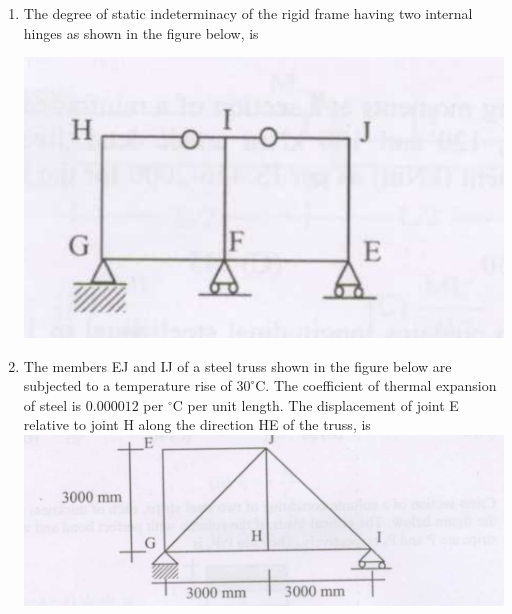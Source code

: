 \documentclass[journal]{IEEEtran}
\begin{document}
\begin{enumerate}
\begin{enumerate}
\end{enumerate}

\vspace{1cm}

\item The degree of static indeterminacy of the rigid frame having two internal hinges as shown in the figure below, is \hfill {}


\includegraphics[width=0.3\columnwidth]{figs/fig6.png} 

\begin{enumerate}
\end{enumerate}

\vspace{1cm}

\item The members EJ and IJ of a steel truss shown in the figure below are subjected to a temperature rise of $30^\circ\text{C}$. The coefficient of thermal expansion of steel is $0.000012$ per $^\circ\text{C}$ per unit length. The displacement  of joint E relative to joint H along the direction HE of the truss, is \hfill {}
\includegraphics[width=\columnwidth]{figs/fig7.png} 
\begin{enumerate}
\end{enumerate}


\end{enumerate}
\end{document}
